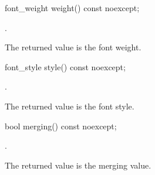 %
\begin{itemdecl}
font_weight weight() const noexcept;
\end{itemdecl}
\begin{itemdescr}
\pnum
\returns {}.

\pnum
\remarks
The returned value is the font weight.
\end{itemdescr}

%
\begin{itemdecl}
font_style style() const noexcept;
\end{itemdecl}
\begin{itemdescr}
\pnum
\returns {}.

\pnum
\remarks
The returned value is the font style.
\end{itemdescr}

%
\begin{itemdecl}
bool merging() const noexcept;
\end{itemdecl}
\begin{itemdescr}
\pnum
\returns {}.

\pnum
\remarks
The returned value is the merging value.
\end{itemdescr}

